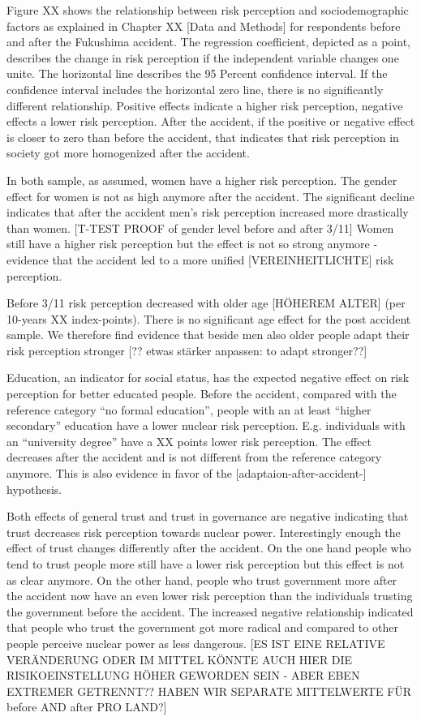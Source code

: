 Figure XX shows the relationship between risk perception and sociodemographic factors as explained in Chapter XX [Data and Methods] for respondents before and after the Fukushima accident. The regression coefficient, depicted as a point, describes the change in risk perception if the independent variable changes one unite. The horizontal line describes the 95 Percent confidence interval. If the confidence interval includes the horizontal zero line, there is no significantly different relationship. 
Positive effects indicate a higher risk perception, negative effects a lower risk perception. After the accident, if the positive or negative effect is closer to zero than before the accident, that indicates that risk perception in society got more homogenized after the accident.   


In both sample, as assumed, women have a higher risk perception. The gender effect for women is not as high anymore after the accident. The significant decline indicates that after the accident men's risk perception increased more drastically than women. [T-TEST PROOF of gender level before and after 3/11] Women still have a higher risk perception but the effect is not so strong anymore - evidence that the accident led to a more unified [VEREINHEITLICHTE] risk perception.  

Before 3/11 risk perception decreased with older age [HÖHEREM ALTER] (per 10-years XX index-points). There is no significant age effect for the post accident sample. We therefore find evidence that beside men also older people adapt their risk perception stronger [?? etwas stärker anpassen: to adapt stronger??]   


Education, an indicator for social status, has the expected negative effect on risk perception for better educated people. Before the accident, compared with the reference category ``no formal education'', people with an at least ``higher secondary''  education have a lower nuclear risk perception. E.g. individuals with an ``university degree'' have a XX points lower risk perception. The effect decreases after the accident and is not different from the reference category anymore. This is also evidence in favor of the [adaptaion-after-accident-] hypothesis.


Both effects of general trust and trust in governance are negative indicating that trust decreases risk perception towards nuclear power. Interestingly enough the effect of trust changes differently after the accident. On the one hand people who tend to trust people more still have a lower risk perception but this effect is not as clear anymore. On the other hand, people who trust government more after the accident now have an even lower risk perception than the individuals trusting the government before the accident. The increased negative relationship indicated that people who trust the government got more radical and compared to other people perceive nuclear power as less dangerous. [ES IST EINE RELATIVE VERÄNDERUNG ODER IM MITTEL KÖNNTE AUCH HIER DIE RISIKOEINSTELLUNG HÖHER GEWORDEN SEIN - ABER EBEN EXTREMER GETRENNT?? HABEN WIR SEPARATE MITTELWERTE FÜR before AND after PRO LAND?]



